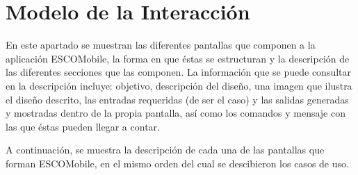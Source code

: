 \documentclass[oneside,10pt]{book}
\begin{document}






\chapter{Modelo de la Interacción}

\noindent
En este apartado se muestran las diferentes pantallas que componen a la aplicación ESCOMobile,
la forma en que éstas se estructuran y la descripción de las diferentes secciones que las componen.
La información que se puede consultar en la descripción incluye: objetivo, descripción del diseño, 
una imagen que ilustra el diseño descrito, las entradas requeridas (de ser el caso) y las salidas
generadas y mostradas dentro de la propia pantalla, así como los comandos y mensaje con las que
éstas pueden llegar a contar.

\noindent
\newline
A continuación, se muestra la descripción de cada una de las pantallas que forman ESCOMobile,
en el mismo orden del cual se descibieron los casos de uso.

\end{document}
